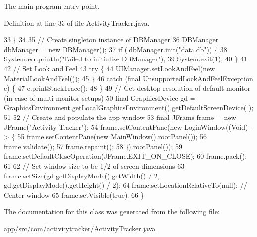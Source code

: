 The main program entry point. 

Definition at line 33 of file Activity\+Tracker.\+java.


\begin{DoxyCode}
33                                                  \{
34 
35         \textcolor{comment}{// Create singleton instance of DBManager}
36         DBManager dbManager = \textcolor{keyword}{new} DBManager();
37         \textcolor{keywordflow}{if} (!dbManager.init(\textcolor{stringliteral}{"data.db"})) \{
38             System.err.println(\textcolor{stringliteral}{"Failed to initialize DBManager"});
39             System.exit(1);
40         \}
41 
42         \textcolor{comment}{// Set Look and Feel}
43         \textcolor{keywordflow}{try} \{
44             UIManager.setLookAndFeel(\textcolor{keyword}{new} MaterialLookAndFeel());
45         \}
46         \textcolor{keywordflow}{catch} (\textcolor{keyword}{final} UnsupportedLookAndFeelException e) \{
47             e.printStackTrace();
48         \}
49         \textcolor{comment}{// Get desktop resolution of default monitor (in case of multi-monitor setups)}
50         \textcolor{keyword}{final} GraphicsDevice gd = GraphicsEnvironment.getLocalGraphicsEnvironment().getDefaultScreenDevice(
      );
51 
52         \textcolor{comment}{// Create and populate the app window}
53         \textcolor{keyword}{final} JFrame frame = \textcolor{keyword}{new} JFrame(\textcolor{stringliteral}{"Activity Tracker"});
54         frame.setContentPane(\textcolor{keyword}{new} LoginWindow((Void) -> \{
55             frame.setContentPane(\textcolor{keyword}{new} MainWindow().rootPanel());
56             frame.validate();
57             frame.repaint();
58         \}).rootPanel());
59         frame.setDefaultCloseOperation(JFrame.EXIT\_ON\_CLOSE);
60         frame.pack();
61 
62         \textcolor{comment}{// Set window size to be 1/2 of screen dimensions}
63         frame.setSize(gd.getDisplayMode().getWidth() / 2, gd.getDisplayMode().getHeight() / 2);
64         frame.setLocationRelativeTo(null); \textcolor{comment}{// Center window}
65         frame.setVisible(\textcolor{keyword}{true});
66     \}
\end{DoxyCode}


The documentation for this class was generated from the following file\+:\begin{DoxyCompactItemize}
\item 
app/src/com/activitytracker/\mbox{\hyperlink{_activity_tracker_8java}{Activity\+Tracker.\+java}}\end{DoxyCompactItemize}
